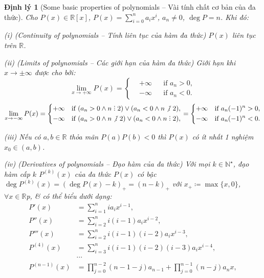 \documentclass{article}
\newtheorem{dinhly}{Định lý}
\DeclareRobustCommand{\divby}{%
	\mathrel{\vbox{\baselineskip.65ex\lineskiplimit0pt\hbox{.}\hbox{.}\hbox{.}}}%
}
\begin{document}
\begin{dinhly}[Some basic properties of polynomials -- Vài tính chất cơ bản của đa thức]
	Cho $P(x)\in\mathbb{R}[x]$, $P(x) = \sum_{i=0}^n a_ix^i$, $a_n\ne0$, $\deg P = n$. Khi đó:
	\item(i) {\rm(Continuity of polynomials -- Tính liên tục của hàm đa thức)} $P(x)$ liên tục trên $\mathbb{R}$.
	\item(ii) {\rm(Limits of polynomials -- Các giới hạn của hàm đa thức)} Giới hạn khi $x\to\pm\infty$ được cho bởi:
	\begin{equation*}
		\lim_{x\to+\infty} P(x) = \left\{\begin{split}
			&+\infty&&\mbox{if } a_n > 0,\\
			&-\infty&&\mbox{if } a_n < 0.
		\end{split}\right.
	\end{equation*}
	\begin{equation*}
		\lim_{x\to-\infty} P(x) = \left\{\begin{split}
			+&\infty&&\mbox{if }(a_n > 0\land n\divby2)\lor(a_n < 0\land n\not{\divby}\ 2),\\
			-&\infty&&\mbox{if }(a_n > 0\land n\not{\divby}\ 2)\lor(a_n < 0\land n\divby2),
		\end{split}\right. = \left\{\begin{split}
			+&\infty&&\mbox{if } a_n(-1)^n > 0,\\
			-&\infty&&\mbox{if } a_n(-1)^n < 0.
		\end{split}\right.
	\end{equation*}
	\item(iii) Nếu có $a,b\in\mathbb{R}$ thỏa mãn $P(a)P(b) < 0$ thì $P(x)$ có ít nhất 1 nghiệm $x_0\in(a,b)$.
	\item(iv) {\rm(Derivatives of polynomials -- Đạo hàm của đa thức)} Với mọi $k\in\mathbb{N}^\star$, đạo hàm cấp $k$ $P^{(k)}(x)$ của đa thức $P(x)$ có bậc $\deg P^{(k)}(x) = (\deg P(x) - k)_+ = (n - k)_+$ với $x_+\coloneqq\max\{x,0\}$, $\forall x\in\mathbb{R}$p, \& có thể biểu dưới dạng:
	\begin{align*}
		P'(x) &= \sum_{i=1}^n ia_ix^{i-1},\\
		P''(x) &= \sum_{i=2}^n i(i - 1)a_ix^{i-2},\\
		P'''(x) &= \sum_{i=2}^n i(i - 1)(i - 2)a_ix^{i-3},\\
		P^{(4)}(x) &= \sum_{i=3}^n i(i - 1)(i - 2)(i - 3)a_ix^{i-4},\\
		&\cdots\\
		P^{(n - 1)}(x) &= \prod_{j=0}^{n-2} (n - 1 - j)a_{n-1} + \prod_{j=0}^{n - 1} (n - j)a_nx,\\

\end{align*}
\end{dinhly}
\end{document}
